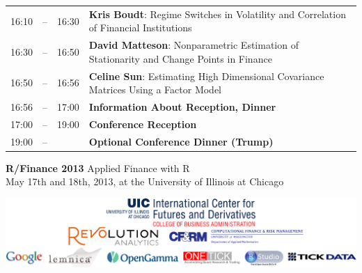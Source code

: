 \begin{tabular}{rlrp{6.1in}}
16:10&\color{Breaks}--\hspace{-10ex}& 16:30&\textbf{\color{Talk} Kris Boudt}: \small{Regime Switches in Volatility and Correlation of Financial Institutions} \\
16:30&\color{Breaks}--\hspace{-10ex}& 16:50&\textbf{\color{Talk} David Matteson}: \small{Nonparametric Estimation of Stationarity and Change Points in Finance} \\
16:50&\color{Breaks}--\hspace{-10ex}& 16:56&\textbf{\color{LightningTalk} Celine Sun}: \small{Estimating High Dimensional Covariance Matrices Using a Factor Model} \\
16:56&\color{Breaks}--\hspace{-10ex}& 17:00&\textbf{\color{Breaks} Information About Reception, Dinner} \\
17:00&\color{Breaks}--\hspace{-10ex}& 19:00&\textbf{\color{Breaks} Conference Reception} \\
19:00&\color{Breaks}--\hspace{-10ex}& &\textbf{\color{Breaks} Optional Conference Dinner (Trump)} \\[12pt]
\end{tabular}

\clearpage

{\Huge \textbf{\color{KeynoteTalk} R/Finance 2013} \huge \phantom{i} Applied Finance with R} \\
{\large \color{Breaks} May 17th and 18th, 2013, at the University of Illinois at Chicago} \\
\vspace{3ex}
\hrulefill
\vspace{-2ex}
\begin{center}
\includegraphics[scale=0.8]{sponsors.pdf}
\end{center}
\vspace{-3ex}
\hrulefill

